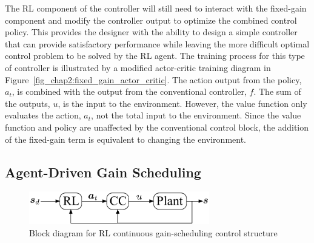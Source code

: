 The RL component of the controller will still need to interact with the fixed-gain component and modify the controller output to optimize the combined control policy. This provides the designer with the ability to design a simple controller that can provide satisfactory performance while leaving the more difficult optimal control problem to be solved by the RL agent.
%
The training process for this type of controller is illustrated by a modified actor-critic training diagram in Figure~\ref{fig_chap2:fixed_gain_actor_critic}. The action output from the policy, $a_t$, is combined with the output from the conventional controller, $f$. The sum of the outputs, $u$, is the input to the environment.
However, the value function only evaluates the action, $a_t$, not the total input to the environment. Since the value function and policy are unaffected by the conventional control block, the addition of the fixed-gain term is equivalent to changing the environment.

\subsection{Agent-Driven Gain Scheduling}
%
\begin{figure}[tb]
\begin{center}
\includegraphics[width = 0.7\textwidth]{figures/figures_RL_model_based_control/Block_diagram_cont_gain_sched_control.pdf}
\caption{Block diagram for RL continuous gain-scheduling control structure} 
\label{fig_chap2:cont_gain_sched_block_diagram}
\end{center}
\end{figure}
%

